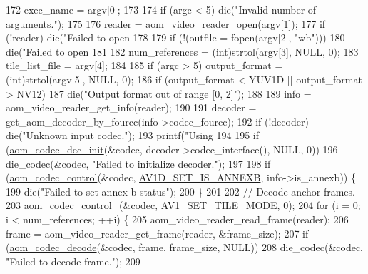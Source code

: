 \begin{DoxyCodeInclude}
{172   exec\_name = argv[0];
173 
174   \textcolor{keywordflow}{if} (argc < 5) die(\textcolor{stringliteral}{"Invalid number of arguments."});
175 
176   reader = aom\_video\_reader\_open(argv[1]);
177   \textcolor{keywordflow}{if} (!reader) die(\textcolor{stringliteral}{"Failed to open %
178 
179   \textcolor{keywordflow}{if} (!(outfile = fopen(argv[2], \textcolor{stringliteral}{"wb"})))
180     die(\textcolor{stringliteral}{"Failed to open %
181 
182   num\_references = (int)strtol(argv[3], NULL, 0);
183   tile\_list\_file = argv[4];
184 
185   \textcolor{keywordflow}{if} (argc > 5) output\_format = (int)strtol(argv[5], NULL, 0);
186   \textcolor{keywordflow}{if} (output\_format < YUV1D || output\_format > NV12)
187     die(\textcolor{stringliteral}{"Output format out of range [0, 2]"});
188 
189   info = aom\_video\_reader\_get\_info(reader);
190 
191   decoder = get\_aom\_decoder\_by\_fourcc(info->codec\_fourcc);
192   \textcolor{keywordflow}{if} (!decoder) die(\textcolor{stringliteral}{"Unknown input codec."});
193   printf(\textcolor{stringliteral}{"Using %
194 
195   \textcolor{keywordflow}{if} (\hyperlink{group__decoder_gafdbfca65b19ab1f6d72b32cd01753b9b}{aom\_codec\_dec\_init}(&codec, decoder->codec\_interface(), NULL, 0))
196     die\_codec(&codec, \textcolor{stringliteral}{"Failed to initialize decoder."});
197 
198   \textcolor{keywordflow}{if} (\hyperlink{group__codec_ga6da974f4eeaba1fa74106b28d0fe6ac5}{aom\_codec\_control}(&codec, \hyperlink{group__aom__decoder_gga3865fd4b3192489baa9a5c3632ebe97ba1fb269c5c5913d9995b6c35d28e2a788}{AV1D\_SET\_IS\_ANNEXB}, info->is\_annexb)) \{
199     die(\textcolor{stringliteral}{"Failed to set annex b status"});
200   \}
201 
202   \textcolor{comment}{// Decode anchor frames.}
203   \hyperlink{group__codec_ga51eb332a40dcacc39000ab8e0be36b79}{aom\_codec\_control\_}(&codec, \hyperlink{group__aom__decoder_gga3865fd4b3192489baa9a5c3632ebe97ba0795d8084ae8c78528c01587198df9e2}{AV1\_SET\_TILE\_MODE}, 0);
204   \textcolor{keywordflow}{for} (i = 0; i < num\_references; ++i) \{
205     aom\_video\_reader\_read\_frame(reader);
206     frame = aom\_video\_reader\_get\_frame(reader, &frame\_size);
207     \textcolor{keywordflow}{if} (\hyperlink{group__decoder_gab03fdb999d1f83a5896869a3ba5f68f7}{aom\_codec\_decode}(&codec, frame, frame\_size, NULL))
208       die\_codec(&codec, \textcolor{stringliteral}{"Failed to decode frame."});
209 
}}}}
\end{DoxyCodeInclude}
